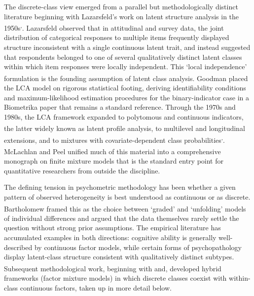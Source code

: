 \documentclass[
  11pt,
]{article}
\begin{document}
The discrete-class view emerged from a parallel but methodologically
distinct literature beginning with Lazarsfeld's work on latent
structure analysis in the 1950s\textsuperscript{,}.
Lazarsfeld observed that in attitudinal and survey data, the joint
distribution of categorical responses to multiple items frequently
displayed structure inconsistent with a single continuous latent
trait, and instead suggested that respondents belonged to one of
several qualitatively distinct latent classes within which item
responses were locally independent. This `local independence'
formulation is the founding assumption of latent class analysis.
Goodman\textsuperscript{} placed the LCA model on rigorous statistical
footing, deriving identifiability conditions and maximum-likelihood
estimation procedures for the binary-indicator case in a Biometrika
paper that remains a standard reference. Through the 1970s and 1980s,
the LCA framework expanded to polytomous and continuous indicators,
the latter widely known as latent profile analysis\textsuperscript{},
to multilevel and longitudinal extensions\textsuperscript{}, and to
mixtures with covariate-dependent class probabilities\textsuperscript{,}. McLachlan and Peel\textsuperscript{} unified much of this material into a
comprehensive monograph on finite mixture models that is the standard
entry point for quantitative researchers from outside the discipline.

The defining tension in psychometric methodology has been whether a
given pattern of observed heterogeneity is best understood as
continuous or as discrete. Bartholomew\textsuperscript{} framed this
as the choice between `graded' and `unfolding' models of individual
differences and argued that the data themselves rarely settle the
question without strong prior assumptions. The empirical literature has
accumulated examples in both directions: cognitive ability is generally
well-described by continuous factor models, while certain forms of
psychopathology display latent-class structure consistent with
qualitatively distinct subtypes. Subsequent methodological work,
beginning with\textsuperscript{} and\textsuperscript{}, developed hybrid
frameworks (factor mixture models) in which discrete classes coexist
with within-class continuous factors, taken up in more detail below.
\end{document}
